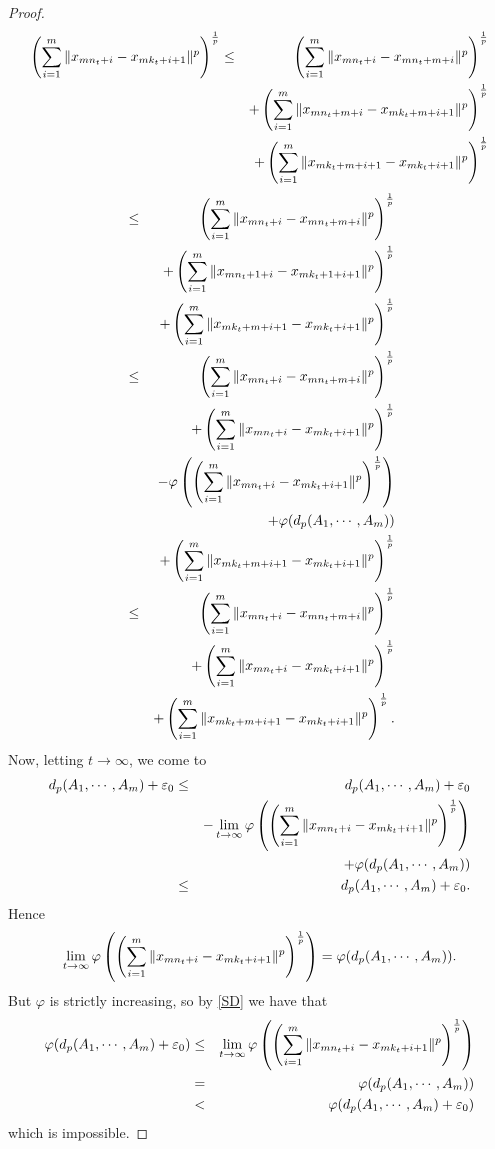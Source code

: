\documentclass{amsart}
\theoremstyle{definition}
\theoremstyle{remark}
\begin{document}
\begin{proof}
\begin{eqnarray*}
\left(\sum_{i=1}^m\|x_{mn_t+i}-x_{mk_t+i+1}\|^p\right)^{1\over p}&\leq&\left(\sum_{i=1}^m\|x_{mn_t+i}-x_{mn_t+m+i}\|^p\right)^{1\over p}\\&&+\left(\sum_{i=1}^m\|x_{mn_t+m+i}-x_{mk_t+m+i+1}\|^p\right)^{1\over p}\\&&+\left(\sum_{i=1}^m\|x_{mk_t+m+i+1}-x_{mk_t+i+1}\|^p\right)^{1\over p}\end{eqnarray*}\begin{eqnarray*}&\leq&\left(\sum_{i=1}^m\|x_{mn_t+i}-x_{mn_t+m+i}\|^p\right)^{1\over p}\\&&+\left(\sum_{i=1}^m\|x_{mn_t+1+i}-x_{mk_t+1+i+1}\|^p\right)^{1\over p}\\&&+\left(\sum_{i=1}^m\|x_{mk_t+m+i+1}-x_{mk_t+i+1}\|^p\right)^{1\over p}\\&\leq&\left(\sum_{i=1}^m\|x_{mn_t+i}-x_{mn_t+m+i}\|^p\right)^{1\over p}\\&&+\left(\sum_{i=1}^m\|x_{mn_t+i}-x_{mk_t+i+1}\|^p\right)^{1\over p}\\&&-\varphi\left(\left(\sum_{i=1}^m\|x_{mn_t+i}-x_{mk_t+i+1}\|^p\right)^{1\over p}\right)\\&&+\varphi(d_p(A_1,\cdots,A_m))\\&&+\left(\sum_{i=1}^m\|x_{mk_t+m+i+1}-x_{mk_t+i+1}\|^p\right)^{1\over p}\\&\leq&\left(\sum_{i=1}^m\|x_{mn_t+i}-x_{mn_t+m+i}\|^p\right)^{1\over p}\\&&+\left(\sum_{i=1}^m\|x_{mn_t+i}-x_{mk_t+i+1}\|^p\right)^{1\over p}\\&&+\left(\sum_{i=1}^m\|x_{mk_t+m+i+1}-x_{mk_t+i+1}\|^p\right)^{1\over p}.
\end{eqnarray*}
Now, letting $t\to\infty$, we come to
\begin{eqnarray*}
d_p(A_1,\cdots,A_m)+\varepsilon_0&\leq&d_p(A_1,\cdots,A_m)+\varepsilon_0\\&&-\lim_{t\to\infty}\varphi\left(\left(\sum_{i=1}^m\|x_{mn_t+i}-x_{mk_t+i+1}\|^p\right)^{1\over p}\right)\\&&+\varphi(d_p(A_1,\cdots,A_m))\\&\leq&d_p(A_1,\cdots,A_m)+\varepsilon_0.
\end{eqnarray*}
Hence
\begin{eqnarray*}
\lim_{t\to\infty}\varphi\left(\left(\sum_{i=1}^m\|x_{mn_t+i}-x_{mk_t+i+1}\|^p\right)^{1\over p}\right)=\varphi(d_p(A_1,\cdots,A_m)).
\end{eqnarray*}
But $\varphi$ is strictly increasing, so by \eqref{SD} we have that
\begin{eqnarray*}
\varphi(d_p(A_1,\cdots,A_m)+\varepsilon_0)&\leq&\lim_{t\to\infty}\varphi\left(\left(\sum_{i=1}^m\|x_{mn_t+i}-x_{mk_t+i+1}\|^p\right)^{1\over p}\right)\\&=&\varphi(d_p(A_1,\cdots,A_m))\\&<&\varphi(d_p(A_1,\cdots,A_m)+\varepsilon_0)
\end{eqnarray*}
which is impossible.
\end{proof}
\end{document}
